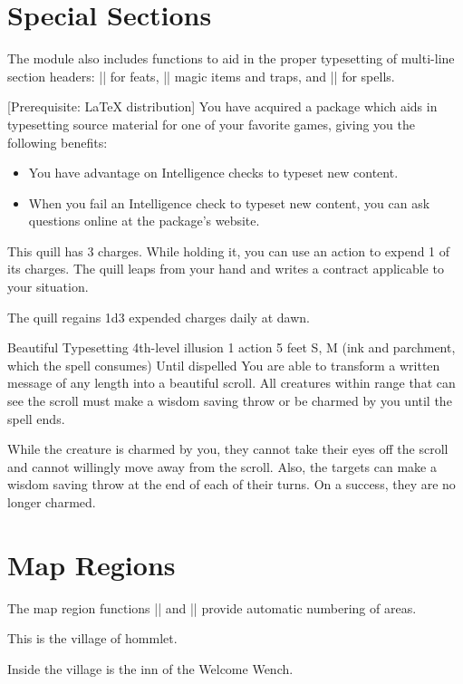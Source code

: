 \documentclass[letterpaper,twocolumn,openany,nodeprecatedcode]{dndbook}
\begin{document}
\section{Special Sections}
The module also includes functions to aid in the proper typesetting of multi-line section headers: |\DndFeatHeader| for feats, |\DndItemHeader| magic items and traps, and |\DndSpellHeader| for spells.

[Prerequisite: \LaTeX{} distribution]
You have acquired a package which aids in typesetting source material for one of your favorite games, giving you the following benefits:

\begin{itemize}
  \item You have advantage on Intelligence checks to typeset new content.
  \item When you fail an Intelligence check to typeset new content, you can ask questions online at the package's website.
\end{itemize}

This quill has 3 charges. While holding it, you can use an action to expend 1 of its charges. The quill leaps from your hand and writes a contract applicable to your situation.

The quill regains 1d3 expended charges daily at dawn.

\DndSpellHeader%
  {Beautiful Typesetting}
  {4th-level illusion}
  {1 action}
  {5 feet}
  {S, M (ink and parchment, which the spell consumes)}
  {Until dispelled}
You are able to transform a written message of any length into a beautiful scroll. All creatures within range that can see the scroll must make a wisdom saving throw or be charmed by you until the spell ends.

While the creature is charmed by you, they cannot take their eyes off the scroll and cannot willingly move away from the scroll. Also, the targets can make a wisdom saving throw at the end of each of their turns. On a success, they are no longer charmed.

\section{Map Regions}
The map region functions |\DndArea| and |\DndSubArea| provide automatic numbering of areas.

This is the village of hommlet.

Inside the village is the inn of the Welcome Wench.
\end{document}
